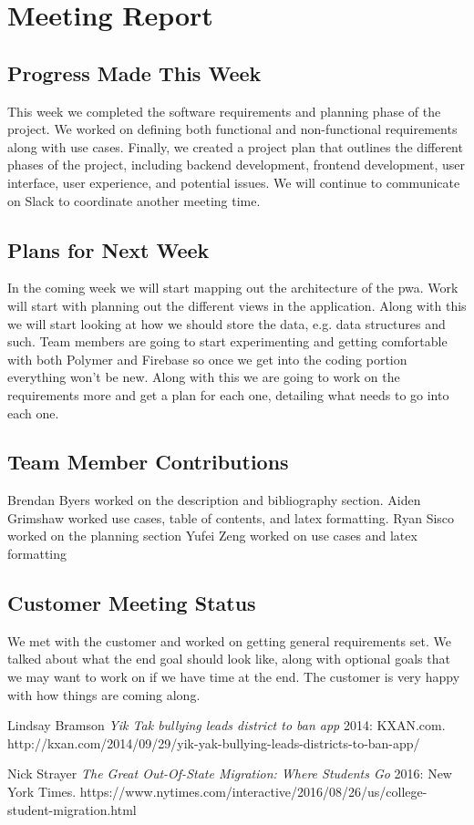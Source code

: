 \documentclass[12pt]{article}
\begin{document}
\section{Meeting Report}

\subsection{Progress Made This Week}
	This week we completed the software requirements and planning phase of the project.  We worked on defining both functional and non-functional requirements along with use cases.  Finally, we created a project plan that outlines the different phases of the project, including backend development, frontend development, user interface, user experience, and potential issues.  We will continue to communicate on Slack to coordinate another meeting time.
\subsection{Plans for Next Week}
	In the coming week we will start mapping out the architecture of the pwa.  Work will start with planning out the different views in the application.  Along with this we will start looking at how we should store the data, e.g. data structures and such.  Team members are going to start experimenting and getting comfortable with both Polymer and Firebase so once we get into the coding portion everything won’t be new.  Along with this we are going to work on the requirements more and get a plan for each one, detailing what needs to go into each one.
\subsection{Team Member Contributions}
	Brendan Byers worked on the description and bibliography section.
	Aiden Grimshaw worked use cases, table of contents, and latex formatting.
	Ryan Sisco worked on the planning section
	Yufei Zeng worked on use cases and latex formatting

\subsection{Customer Meeting Status}
	We met with the customer and worked on getting general requirements set.  We talked about what the end goal should look like, along with optional goals that we may want to work on if we have time at the end.  The customer is very happy with how things are coming along.
	
\newpage
  \begin{thebibliography}{1}

   Lindsay Bramson {\em Yik Tak bullying leads district to ban app}  2014: KXAN.com. http://kxan.com/2014/09/29/yik-yak-bullying-leads-districts-to-ban-app/

    Nick Strayer {\em The Great Out-Of-State Migration: Where Students Go} 2016:
  New York Times. https://www.nytimes.com/interactive/2016/08/26/us/college-student-migration.html

  \end{thebibliography}
\end{document}
